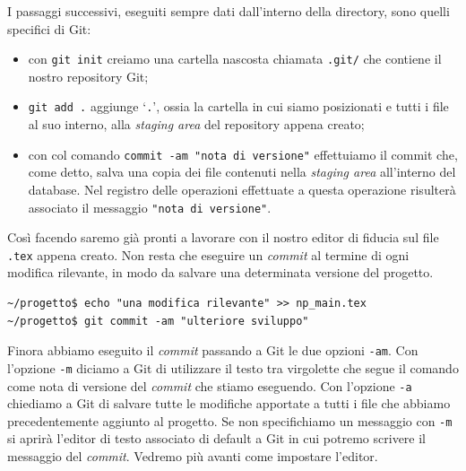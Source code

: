 \documentclass[a4paper,12pt,oneside]{article}
\begin{document}
I passaggi successivi, eseguiti sempre dati dall'interno della directory, sono
quelli specifici di Git:
\begin{itemize}
\item con \lstinline|git init| creiamo una cartella nascosta chiamata
  \lstinline|.git/| che contiene il nostro repository Git;
\item \lstinline|git add .| aggiunge `\lstinline|.|', ossia la cartella in cui
  siamo posizionati e tutti i file al suo interno,  alla \emph{staging area}
  del repository appena creato;
\item con col comando \lstinline|commit -am "nota di versione"| effettuiamo il
  commit che, come detto, salva una copia dei file contenuti nella \emph{staging
    area} all'interno del database. Nel registro delle operazioni effettuate a
  questa operazione risulterà associato il messaggio \lstinline|"nota di versione"|.
\end{itemize}

Così facendo saremo già pronti a lavorare con il nostro editor di fiducia sul
file \lstinline|.tex| appena creato.
Non resta che eseguire un \emph{commit} al termine di ogni modifica rilevante,
in modo da salvare una determinata versione del progetto.
\begin{lstlisting}
~/progetto$ echo "una modifica rilevante" >> np_main.tex
~/progetto$ git commit -am "ulteriore sviluppo"
\end{lstlisting}

Finora abbiamo eseguito il \emph{commit} passando a Git le due opzioni
\lstinline|-am|. Con l'opzione \lstinline|-m| diciamo a Git di utilizzare il
testo tra virgolette che segue il comando come nota di versione del \emph{commit}
che stiamo eseguendo. Con l'opzione \lstinline|-a| chiediamo a Git di salvare
tutte le modifiche apportate a tutti i file che abbiamo precedentemente aggiunto
al progetto. Se non specifichiamo un messaggio con \lstinline|-m| si aprirà
l'editor di testo associato di default a Git in cui potremo scrivere il messaggio
del \emph{commit}. Vedremo più avanti come impostare l'editor.
\end{document}
